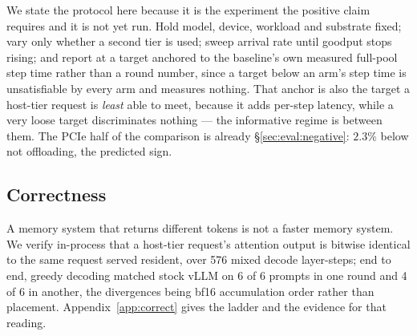 We state the protocol here because it is the experiment the positive claim requires
and it is not yet run. Hold model, device, workload and substrate fixed; vary only
whether a second tier is used; sweep arrival rate until goodput stops rising; and
report at a target anchored to the baseline's own measured full-pool step time
rather than a round number, since a target below an arm's step time is
unsatisfiable by every arm and measures nothing. That anchor is also the target a
host-tier request is \emph{least} able to meet, because it adds per-step latency,
while a very loose target discriminates nothing --- the informative regime is
between them. The PCIe half of the comparison is already
\S\ref{sec:eval:negative}: $2.3\%$ below not offloading, the predicted sign.

\subsection{Correctness}
\label{sec:eval:correct}

A memory system that returns different tokens is not a faster memory system. We
verify in-process that a host-tier request's attention output is bitwise identical to
the same request served resident, over 576 mixed decode layer-steps; end to end,
greedy decoding matched stock vLLM on 6 of 6 prompts in one round and 4 of 6 in
another, the divergences being bf16 accumulation order rather than placement.
Appendix~\ref{app:correct} gives the ladder and the evidence for that reading.
